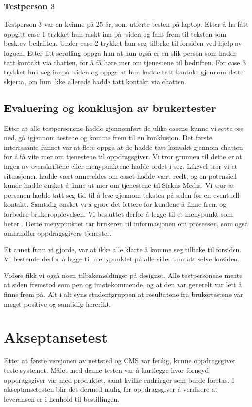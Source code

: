 \subsubsection{Testperson 3}
Testperson 3 var en kvinne på 25 år, som utførte testen på laptop. Etter å ha fått oppgitt case 1 trykket hun raskt inn på -siden og fant frem til teksten som beskrev bedriften. Under case 2 trykket hun seg tilbake til forsiden ved hjelp av logoen. Etter litt scrolling oppga hun at hun også er en slik person som hadde tatt kontakt via chatten, for å få høre mer om tjenestene til bedriften. For case 3 trykket hun seg innpå -siden og oppga at hun hadde tatt kontakt gjennom dette skjema, om hun ikke allerede hadde tatt kontakt via chatten. 

\subsection{Evaluering og konklusjon av brukertester}
Etter at alle testpersonene hadde gjennomført de ulike casene kunne vi sette oss ned, gå igjennom testene og komme frem til en konklusjon. Det første interessante funnet var at flere oppga at de hadde tatt kontakt gjennom chatten for å få vite mer om tjenestene til oppdragsgiver. Vi tror grunnen til dette er at ingen av overskriftene eller menypunktene hadde ordet  i seg. Likevel tror vi at situasjonen hadde vært annereldes om caset hadde vært reelt, og en potensiell kunde hadde ønsket å finne ut mer om tjenestene til Sirkus Media. Vi tror at personen hadde tatt seg tid til å lese gjennom teksten på siden før en eventuell kontakt. Samtidig ønsket vi å gjøre det lettere for kundene å finne frem og forbedre brukeropplevelsen. Vi besluttet derfor å legge til et menypunkt som heter . Dette menypunktet tar brukeren til informasjonen om prosessen, som også omhandler oppdragsgivers tjenester.

Et annet funn vi gjorde, var at ikke alle klarte å komme seg tilbake til forsiden. Vi bestemte derfor å legge til menypunktet  på alle sider unntatt selve forsiden.

Videre fikk vi også noen tilbakemeldinger på designet. Alle testpersonene mente at siden fremstod som pen og imøtekommende, og at den var generelt var lett å finne frem på. Alt i alt syns studentgruppen at resultatene fra brukertestene var meget positive og samtidig lærerikt.

\section{Akseptansetest}
Etter at første versjonen av nettsted og CMS var ferdig, kunne oppdragsgiver teste systemet. Målet med denne testen var å kartlegge hvor fornøyd oppdragsgiver var med produktet, samt hvilke endringer som burde foretas. I akseptansetesten blir det dermed mulig for oppdragsgiver å verifisere at leveransen er i henhold til bestillingen. 

